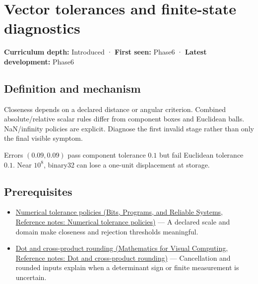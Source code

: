 \hypertarget{appendix-b5b83329215b}{}\label{referencestart:appendix-b5b83329215b}
\section{Vector tolerances and finite-state diagnostics}\label{appendix-b5b83329215b-vector-tolerances-and-finite-state-diagnostics}

\textbf{Curriculum depth:} Introduced · \textbf{First seen:} Phase6 · \textbf{Latest development:} Phase6

\begin{allmightroledefinition}

\subsection{Definition and mechanism}\label{appendix-b5b83329215b-definition-and-mechanism}

Closeness depends on a declared distance or angular criterion. Combined absolute/relative scalar rules differ from component boxes and Euclidean balls. NaN/infinity policies are explicit. Diagnose the first invalid stage rather than only the final visible symptom.

\end{allmightroledefinition}

Errors \((0.09,0.09)\) pass component tolerance \(0.1\) but fail Euclidean tolerance \(0.1\). Near \(10^8\), binary32 can lose a one-unit displacement at storage.

\subsection{Prerequisites}\label{appendix-b5b83329215b-prerequisites}

\begin{itemize}
\tightlist
\item
  \href{../01-Bits-Programs-and-Reliable-Systems/main.pdf\#nameddest=appendix-0ec599f8ba27}{Numerical tolerance policies (Bits, Programs, and Reliable Systems, Reference notes: Numerical tolerance policies)} --- A declared scale and domain make closeness and rejection thresholds meaningful.
\item
  \href{../02-Mathematics-for-Visual-Computing/main.pdf\#nameddest=appendix-5aef4f13483a}{Dot and cross-product rounding (Mathematics for Visual Computing, Reference notes: Dot and cross-product rounding)} --- Cancellation and rounded inputs explain when a determinant sign or finite measurement is uncertain.
\end{itemize}

